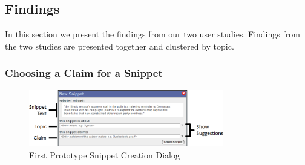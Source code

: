 \documentclass{chi2009}
\newcommand{\todo}[1]{}
\begin{document}
\subsection{Findings}

In this section we present the findings from our two user studies. Findings from the two studies are presented together and clustered by topic.


% 
% 
% 

\subsubsection{Choosing a Claim for a Snippet}

\begin{figure}[t]
	\includegraphics[width=8.5cm]{../screenshots/oldsnipcreate_diagram.png}
	\caption{First Prototype Snippet Creation Dialog}
	\label{oldsnippetbox}
\end{figure}
\end{document}
